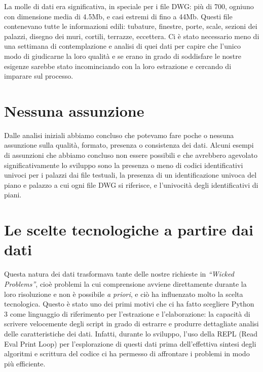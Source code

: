 \documentclass[12pt]{report}
\begin{document}
La molle di dati era significativa, in speciale per i file DWG: più di 700, ogniuno con dimensione media di 4.5Mb, e casi estremi di fino a 44Mb. Questi file contenevano tutte le informazioni edili: tubature, finestre, porte, scale, sezioni dei palazzi, disegno dei muri, cortili, terrazze, eccettera. Ci è stato necessario meno di una settimana di contemplazione e analisi di quei dati per capire che l'unico modo di giudicarne la loro qualità e se erano in grado di soddisfare le nostre esigenze sarebbe stato incominciando con la loro estrazione e cercando di imparare sul processo.


\section*{Nessuna assunzione}

Dalle analisi iniziali abbiamo concluso che potevamo fare poche o nessuna assunzione sulla qualità, formato, presenza o consistenza dei dati. Alcuni esempi di assunzioni che abbiamo concluso non essere possibili e che avrebbero agevolato significativamente lo sviluppo sono la presenza o meno di codici identificativi univoci per i palazzi dai file testuali, la presenza di un identificazione univoca del piano e palazzo a cui ogni file DWG si riferisce, e l'univocità degli identificativi di piani. 

\section{Le scelte tecnologiche a partire dai dati}

Questa natura dei dati trasformava tante delle nostre richieste in \textit{``Wicked Problems''}, cioè problemi la cui comprensione avviene direttamente durante la loro risoluzione e non è possibile \textit{a priori}, e ciò ha influenzato molto la scelta tecnologica. Questo è stato uno dei primi motivi che ci ha fatto scegliere Python 3 come linguaggio di riferimento per l'estrazione e l'elaborazione: la capacità di scrivere velocemente degli script in grado di estrarre e produrre dettagliate analisi delle caratteristiche dei dati. Infatti, durante lo sviluppo, l'uso della REPL (Read Eval Print Loop) per l'esplorazione di questi dati prima dell'effettiva sintesi degli algoritmi e scrittura del codice ci ha permesso di affrontare i problemi in modo più efficiente.
\end{document}
